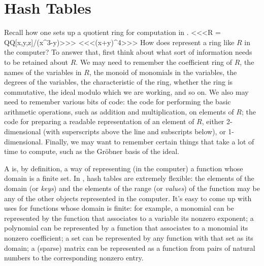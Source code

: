 \section{Hash Tables}

Recall how one sets up a quotient ring for computation in \Mtwo.
<<<R = QQ[x,y,z]/(x^3-y)>>>
<<<(x+y)^4>>>
How does \Mtwo represent a ring like $R$ in the computer?  To answer that,
first think about what sort of information needs to be retained about $R$.
We may need to remember the coefficient ring of $R$, the names of the
variables in $R$, the monoid of monomials in the variables, the degrees of
the variables, the characteristic of the ring, whether the ring is
commutative, the ideal modulo which we are working, and so on.  We also may
need to remember various bits of code: the code for performing the basic
arithmetic operations, such as addition and multiplication, on elements of
$R$; the code for preparing a readable representation of an element of $R$,
either 2-dimensional (with superscripts above the line and subscripts below),
or 1-dimensional.  Finally, we may want to remember certain things that take
a lot of time to compute, such as the Gr\"obner basis of the ideal.

A {\sl {}} is, by definition, a way of representing (in the computer)
a function whose domain is a finite set.  In \Mtwo, hash tables are extremely
flexible: the elements of the domain (or {\sl keys}) and the elements of the
range (or {\sl values}) of the function may be any of the other objects
represented in the computer.  It's easy to come up with uses for functions
whose domain is finite: for example, a monomial can be represented by the
function that associates to a variable its nonzero exponent; a polynomial can
be represented by a function that associates to a monomial its nonzero
coefficient; a set can be represented by any function with that set as its
domain; a (sparse) matrix can be represented as a function from pairs of
natural numbers to the corresponding nonzero entry.

